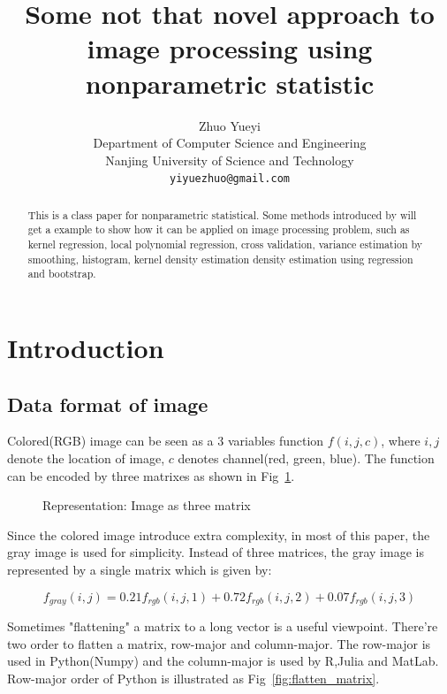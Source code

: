 \documentclass{article}
\title{Some not that novel approach to image processing using nonparametric statistic}
\author{
  Zhuo Yueyi \\ %
  Department of Computer Science and Engineering\\
  Nanjing University of Science and Technology\\
  \texttt{yiyuezhuo@gmail.com} \\
}
\begin{document}
\maketitle

\begin{abstract}
This is a class paper for nonparametric statistical. 
Some methods introduced by \cite{wasserman2006all} will get a example to show how it can be applied on
image processing problem, such as kernel regression, local polynomial regression, cross validation, variance estimation
by smoothing, histogram, kernel density estimation density estimation using regression and bootstrap.
\end{abstract}




\section{Introduction}




\subsection{Data format of image}

Colored(RGB) image can be seen as a 3 variables function  $f(i,j,c)$, where $i,j$ denote the location of image, $c$ denotes
channel(red, green, blue). The function can be encoded by three matrixes as shown in Fig~\ref{fig:toad_rgb}.

\begin{figure}[htb]
  \centering
  
  \caption{Representation: Image as three matrix}
  \label{fig:toad_rgb}
\end{figure}

Since the colored image introduce extra complexity, in most of this paper, the gray image is used for simplicity.
Instead of three matrices, the gray image is represented by a single matrix which is given by:

\begin{equation}
  f_{gray}(i,j) = 0.21 f_{rgb}(i,j,1) + 0.72 f_{rgb}(i,j,2) + 0.07 f_{rgb}(i,j,3)
  \label{eq:rgb_to_gray}
\end{equation}

Sometimes "flattening" a matrix to a long vector is a useful viewpoint. There're two order to flatten a matrix,
row-major and column-major. The row-major is used in Python(Numpy) and the column-major is used by R,Julia and MatLab.
Row-major order of Python is illustrated as Fig~\ref{fig:flatten_matrix}.
\end{document}
